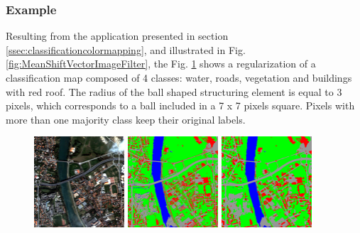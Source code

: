 \subsubsection{Example}

Resulting from the  application presented in section \ref{ssec:classificationcolormapping}, and illustrated in
Fig. \ref{fig:MeanShiftVectorImageFilter}, the Fig. \ref{fig:ClassificationMapRegularizationApplication} shows a regularization of a classification
map composed of 4 classes: water, roads, vegetation and buildings with red roof. The radius of the ball shaped structuring element is equal to 3 pixels,
which corresponds to a ball included in a 7 x 7 pixels square. Pixels with more than one majority class keep their original labels.


\begin{figure}[!h]
  \center
  \includegraphics[width=0.3\textwidth]{../Art/MonteverdiImages/classification_chain_inputimage.jpg}
  \includegraphics[width=0.3\textwidth]{../Art/MonteverdiImages/classification_chain_fancyclassif_CMR_input.png}
  \includegraphics[width=0.3\textwidth]{../Art/MonteverdiImages/classification_chain_fancyclassif_CMR_3.png}
  \label{fig:ClassificationMapRegularizationApplication}
\end{figure}




